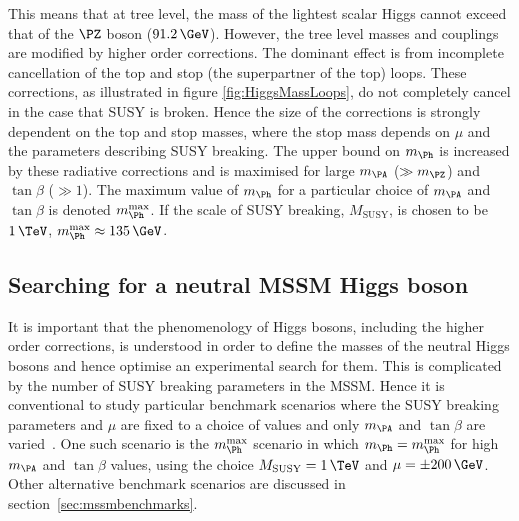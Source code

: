 This means that at tree level, the mass of the lightest scalar Higgs cannot
exceed that of the $\PZ$ boson ($91.2\,\GeV$). However, the tree level masses and
couplings are modified by higher order corrections. The dominant effect is from
incomplete cancellation of the top and stop (the superpartner of the top) loops.
These corrections, as illustrated in figure \ref{fig:HiggsMassLoops}, do not
completely cancel in the case that \ac{SUSY} is broken. Hence the size of the
corrections is strongly dependent on the top and stop masses, where the stop
mass depends on $\mu$ and the parameters describing \ac{SUSY} breaking. The upper
bound on $m_{\Ph}$ is increased by these radiative corrections and is maximised
for large $m_{\PA}$ ($\gg m_{\PZ}$) and $\tan\beta$ ($\gg1$). The maximum value of
$m_{\Ph}$ for a particular choice of $m_{\PA}$ and $\tan\beta$ is denoted
$m_{\Ph}^{\text{max}}$. If the scale of SUSY breaking, $M_{\text{SUSY}}$, is
chosen to be $1\,\TeV$, $m_{\Ph}^{\text{max}} \approx 135\,\GeV$.

\subsection{Searching for a neutral MSSM Higgs boson}
\label{sec:LHCMSSMHiggs}

It is important that the phenomenology of Higgs bosons, including the higher
order corrections, is understood in order to define the masses of the neutral
Higgs bosons and hence optimise an experimental search for them. This is
complicated by the number of \ac{SUSY} breaking parameters in the \ac{MSSM}. Hence it
is conventional to study particular benchmark scenarios where the \ac{SUSY} breaking
parameters and $\mu$ are fixed to a choice of values and only $m_{\PA}$ and
$\tan\beta$ are varied~\cite{Carena:1999xa,Carena:2002es}. 
One such scenario is the $m_{\Ph}^{\text{max}}$ scenario
in which $m_{\Ph}=m_{\Ph}^{\text{max}}$ for high $m_{\PA}$ and $\tan\beta$
values, using the choice $M_{\text{SUSY}} = 1\,\TeV$ and $\mu = \pm 200\,\GeV$.
Other alternative benchmark scenarios are discussed in 
section~\ref{sec:mssmbenchmarks}. 

